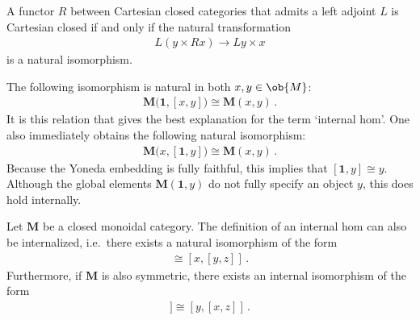     \begin{property}
        A functor $R$ between Cartesian closed categories that admits a left adjoint $L$ is Cartesian closed if and only if the natural transformation
        \begin{gather}
            L(y\times Rx)\rightarrow Ly\times x
        \end{gather}
        is a natural isomorphism.
    \end{property}

    \begin{property}\label{cat:internal_hom_property}
        The following isomorphism is natural in both $x,y\in\ob{M}$:
        \begin{gather}
            \mathbf{M}\bigl(\mathbf{1},[x,y]\bigr)\cong\mathbf{M}(x,y)\,.
        \end{gather}
        It is this relation that gives the best explanation for the term `internal hom'. One also immediately obtains the following natural isomorphism:
        \begin{gather}
            \mathbf{M}\bigl(x,[\mathbf{1},y]\bigr)\cong\mathbf{M}(x,y)\,.
        \end{gather}
        Because the Yoneda embedding is fully faithful, this implies that $[\mathbf{1},y]\cong y$. Although the global elements $\mathbf{M}(\mathbf{1},y)$ do not fully specify an object $y$, this does hold internally.
    \end{property}

    \begin{property}[Symmetry]\label{cat:internal_symmetry}
        Let $\mathbf{M}$ be a closed monoidal category. The definition of an internal hom can also be internalized, i.e.~there exists a natural isomorphism of the form
        \begin{gather}
            [x\otimes y,z]\cong[x,[y,z]]\,.
        \end{gather}
        Furthermore, if $\mathbf{M}$ is also symmetric, there exists an internal isomorphism of the form
        \begin{gather}
            [x,[y,z]]\cong[y,[x,z]]\,.
        \end{gather}
    \end{property}

